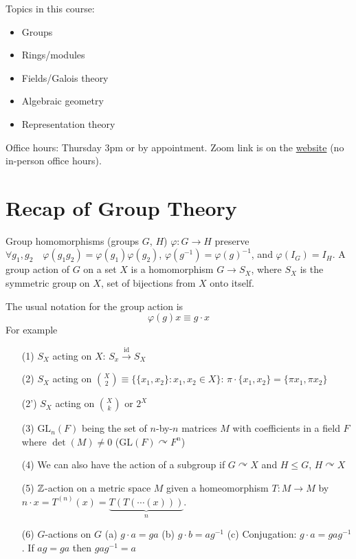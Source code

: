 \documentclass[a4paper,twoside,master.tex]{subfiles}
\begin{document}

Topics in this course:
\begin{itemize}
    \item Groups
    \item Rings/modules
    \item Fields/Galois theory
    \item Algebraic geometry
    \item Representation theory
\end{itemize}

Office hours: Thursday 3pm or by appointment. Zoom link is on the \href{www.borisbukh.org}{website} (no in-person office hours).

\section{Recap of Group Theory}
\label{sec:recap_of_group_theory}

Group homomorphisms (groups $ G $, $ H $) $ \varphi \colon G \to H $ preserve $ \forall g_1, g_2\quad \varphi(g_1 g_2) = \varphi(g_1) \varphi(g_2) $, $ \varphi(g^{-1}) = \varphi(g)^{-1} $, and $ \varphi(I_G) = I_H $. A group action of $ G $ on a set $ X $ is a homomorphism $ G \to S_X $, where $ S_X $ is the symmetric group on $ X $, set of bijections from $ X $ onto itself.

The usual notation for the group action is
\begin{equation}
    \varphi(g) x \equiv g \cdot x
\end{equation}
For example
\begin{itemize}
    \item[(1)] $ S_X $ acting on $ X $: $ S_x \xrightarrow{\text{id}} S_X $
    \item[(2)] $ S_X $ acting on $ \binom{X}{2} \equiv \{ \{x_1, x_2\} \colon x_1, x_2 \in X\} $: $ \pi \cdot \{x_1, x_2\} = \{\pi x_1, \pi x_2\} $
    \item[(2')] $ S_X $ acting on $ \binom{X}{k} $ or $ 2^X $
    \item[(3)] $ \text{GL}_n(F) $ being the set of $ n $-by-$ n $ matrices $ M $ with coefficients in a field $ F $ where $ \det(M) \neq 0 $ ($ \text{GL}(F) \curvearrowright F^n $)
    \item[(4)] We can also have the action of a subgroup if $ G \curvearrowright X $ and $ H \leq G $, $ H\curvearrowright X $ 
    \item[(5)] $ \mathbb{Z} $-action on a metric space $ M $ given a homeomorphism $ T\colon M \to M $ by $ n \cdot x = T^{(n)}(x) = \underbrace{T(T(\cdots(x)))}_{n} $.
    \item[(6)] $ G $-actions on $ G $
        \subitem(a) $ g \cdot a = g a $
        \subitem(b) $ g \cdot b = a g^{-1} $
        \subitem(c) Conjugation: $ g \cdot a = g a g^{-1} $. If $ ag = g a $ then $ gag^{-1} = a $
\end{itemize}
\end{document}
